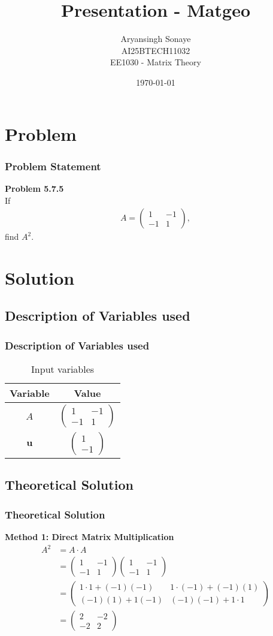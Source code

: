 \documentclass{beamer}
\title{Presentation - Matgeo}
\author{Aryansingh Sonaye \\
AI25BTECH11032 \\
EE1030 - Matrix Theory}
\date{\today}
\theoremstyle{remark}
\newcommand{\myvec}[1]{\ensuremath{\begin{pmatrix}#1\end{pmatrix}}}
\let\vec\mathbf
\numberwithin{equation}{section}
\begin{document}
\begin{frame}
\titlepage
\end{frame}

\section{Problem}
\begin{frame}
\frametitle{Problem Statement}
\textbf{Problem 5.7.5}\\
If 
\begin{align}
A = \myvec{1 & -1 \\ -1 & 1},
\end{align}
find $A^2$.
\end{frame}

\section{Solution}
\subsection{Description of Variables used}
\begin{frame}
\frametitle{Description of Variables used}
\begin{table}[H]
\centering
\begin{tabular}{|c|c|}
\hline
\textbf{Variable} & \textbf{Value} \\
\hline
$A$ & $\myvec{1 & -1 \\ -1 & 1}$ \\
\hline
$\vec{u}$ & $\myvec{1 \\ -1}$ \\
\hline
\end{tabular}
\caption{Input variables}
\end{table}


\end{frame}

\subsection{Theoretical Solution }
\begin{frame}
\frametitle{Theoretical Solution}
\textbf{Method 1: Direct Matrix Multiplication}
\begin{align}
A^2 &= A \cdot A \\
&= \myvec{1 & -1 \\ -1 & 1}\myvec{1 & -1 \\ -1 & 1} \\
&= \myvec{1\cdot 1 + (-1)(-1) & 1\cdot (-1) + (-1)(1) \\ (-1)(1) + 1(-1) & (-1)(-1) + 1\cdot 1} \\
&= \myvec{2 & -2 \\ -2 & 2}
\end{align}

\end{frame}
\end{document}
